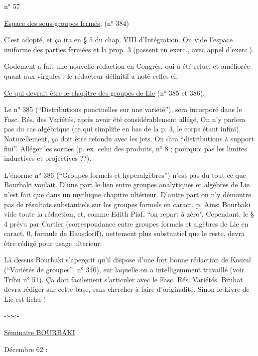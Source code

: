 \hfill n° 57

\uline{Espace des sous-groupes fermés}, (n° 384)

C'est adopté, et ça ira en \S{} 5 du chap. VIII d'Intégration. On vide l'espace uniforme des parties fermées et la prop. 3 (passent en exerc., avec appel d'exerc.).

Godement a fait une nouvelle rédaction en Congrès, qui a été relue, et améliorée quant aux virgules ; le rédacteur définitif a noté celles-ci.

\uline{Ce qui devrait être le chapitre des groupes de Lie} (n° 385 et 386).

Le n° 385 (``Distributions ponctuelles sur une variété''), sera incorporé dans le Fasc. Rés. des Variétés, après avoir été considérablement allégé, On n'y parlera pas du cas algébrique (ce qui simplifie en bas de la p. 3, le corps étant infini). Naturellement, ça doit être refondu avec les jets. On dira ``distributions à support fini''. Alléger les sorites (p. ex. celui des produits, n° 8 ; pourquoi pas les limites inductives et projectives ??).

L'énorme n° 386 (``Groupes formels et hyperalgèbres'') n'est pas du tout ce que Bourbaki voulait. D'une part le lien entre groupes analytiques et algèbres de Lie n'est fait que dans un mythique chapitre ultérieur. D'autre part on n'y démontre pas de résultats substantiels sur les groupes formels en caract. p. Ainsi Bourbaki vide toute la rédaction, et, comme Edith Piaf, ``on repart à zéro''. Cependant, le \S{} 4 prévu par Cartier (correspondance entre groupes formels et algèbres de Lie en caract. 0, formule de Hausdorff), nettement plus substantiel que le reste, devra être rédigé pour usage ulterieur.

Là dessus Bourbaki s'aperçoit qu'il dispose d'une fort bonne rédaction de Koszul (``Variétés de groupes'', n° 340), sur laquelle on a intelligemment travaillé (voir Tribu n° 51). Ça doit facilement s'articuler avec le Fasc. Rés. Variétés. Bruhat devra rédiger sur cette base, sans chercher à faire d'originalité. Sinon le Livre de Lie est fichu !

\begin{center}
-:-:-:-
\end{center}

\begin{center}
\uline{Séminaire BOURBAKI}
\end{center}

Décembre 62 :


